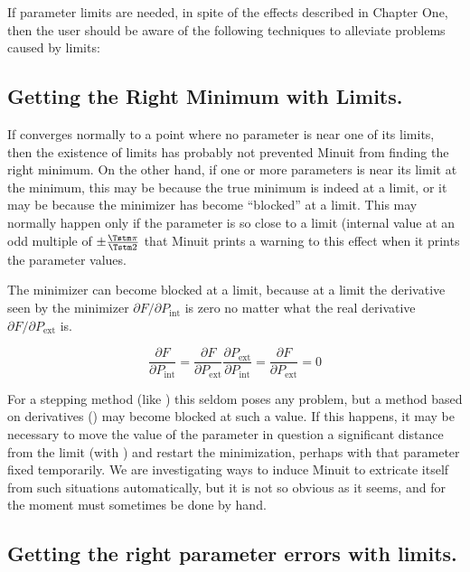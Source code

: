 If parameter limits are needed, in spite of the effects described
in Chapter One, then the user should be aware of the following
techniques to alleviate problems caused by limits:

\subsection{Getting the Right Minimum with Limits.}

If  converges normally to a point where no parameter is
near one of its limits, then the existence of limits has
probably not prevented Minuit from finding the right minimum.
On the other hand, if one or more parameters is near its limit
at the minimum, this may be because the true minimum is indeed
at a limit, or it may be because the minimizer has become 
``blocked'' at a limit.  
This may normally happen only if the parameter
is so close to a limit (internal value at an odd multiple
of $\pm \frac{\Tstm \pi}{\Tstm 2}$ that Minuit prints a warning to this effect
when it prints the parameter values.

The minimizer can become blocked at a limit, because at a limit
the derivative seen by the minimizer 
$\partial F / \partial P_{\mathrm{int}}$
is zero no matter what the real derivative
$\partial F / \partial P_{\mathrm{ext}}$ is.

$$
\frac{\partial F}{\partial P_{\mathrm{int}}}                =
\frac{\partial F}{\partial P_{\mathrm{ext}}}
\frac{\partial P_{\mathrm{ext}}}{\partial P_{\mathrm{int}}} =
\frac{\partial F}{\partial P_{\mathrm{ext}}}                = 0
$$

For a stepping method (like ) 
this seldom poses any problem,
but a method based on derivatives () may become blocked
at such a value.
If this happens, it may be necessary to move the value of the
parameter in question a significant distance from the
limit (with ) and restart the minimization, perhaps
with that parameter fixed temporarily.
We are investigating ways to induce Minuit to extricate itself from
such situations automatically, but it is not so obvious as it seems,
and for the moment must sometimes be done by hand.

\subsection{Getting the right parameter errors with limits.}
\label{sec:right-errors}

